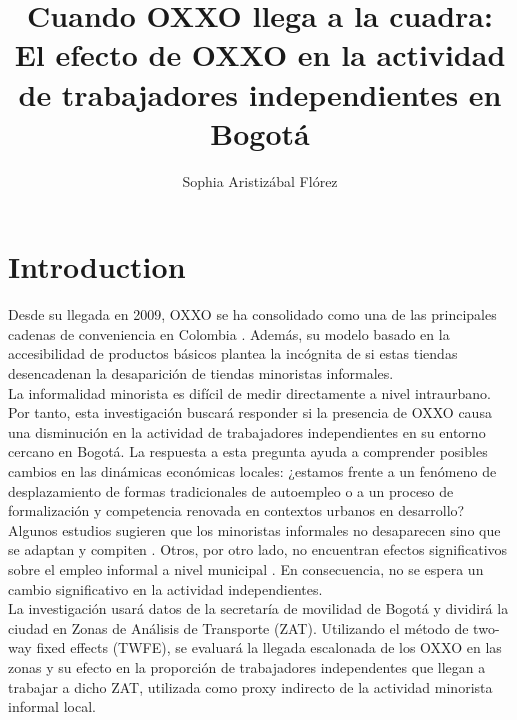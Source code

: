 \documentclass{article}
\title{Cuando OXXO llega a la cuadra: El efecto de OXXO en la actividad de trabajadores independientes en Bogotá}
\author{Sophia Aristizábal Flórez}
\date{}
\begin{document}
\maketitle

\section{Introduction}

Desde su llegada en 2009, OXXO se ha consolidado como una de las principales cadenas de conveniencia en Colombia \parencite{m_2025}. 
Además, su modelo basado en la accesibilidad de productos básicos plantea la incógnita de si estas tiendas desencadenan la desaparición de tiendas minoristas informales. \\


La informalidad minorista es difícil de medir directamente a nivel intraurbano. Por tanto, esta investigación buscará responder si la presencia de OXXO causa una disminución en la actividad de trabajadores independientes en su entorno cercano en Bogotá. La respuesta a esta pregunta ayuda a comprender posibles cambios en las dinámicas económicas locales: ¿estamos frente a un fenómeno de desplazamiento de formas tradicionales de autoempleo o a un proceso de formalización y competencia renovada en contextos urbanos en desarrollo? \\

Algunos estudios sugieren que los minoristas informales no desaparecen sino que se adaptan y compiten \parencite{marcos2022}. Otros, por otro lado, no encuentran efectos significativos sobre el empleo informal a nivel municipal \parencite{delgado2024}. En consecuencia, no se espera un cambio significativo en la actividad independientes. \\

La investigación usará datos de la secretaría de movilidad de Bogotá y dividirá la ciudad en Zonas de Análisis de Transporte (ZAT).  Utilizando el método de two-way fixed effects (TWFE), se evaluará la llegada escalonada de los OXXO en las zonas y su efecto en la proporción de trabajadores independentes que llegan a trabajar a dicho ZAT, utilizada como proxy indirecto de la actividad minorista informal local. \\
\end{document}
